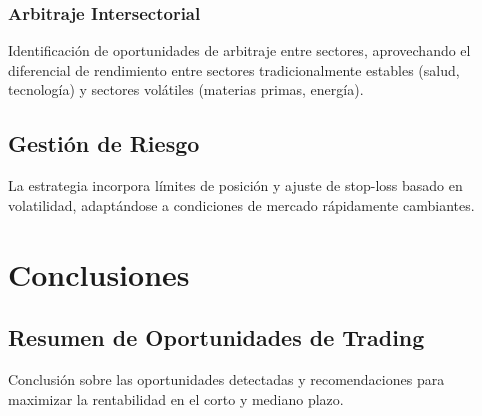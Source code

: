 \documentclass{report}
\begin{document}
\subsection{Arbitraje Intersectorial}
Identificación de oportunidades de arbitraje entre sectores, aprovechando el diferencial de rendimiento entre sectores tradicionalmente estables (salud, tecnología) y sectores volátiles (materias primas, energía).

\section{Gestión de Riesgo}
La estrategia incorpora límites de posición y ajuste de stop-loss basado en volatilidad, adaptándose a condiciones de mercado rápidamente cambiantes.

\chapter{Conclusiones}
\section{Resumen de Oportunidades de Trading}
Conclusión sobre las oportunidades detectadas y recomendaciones para maximizar la rentabilidad en el corto y mediano plazo.
\end{document}
